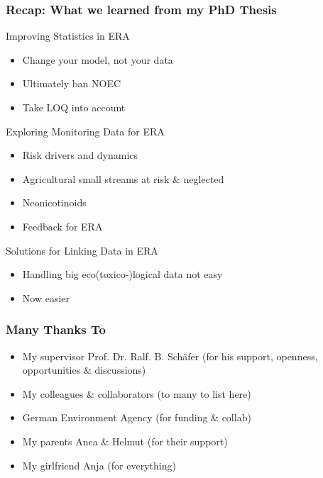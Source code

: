 \documentclass[
	10pt
	]{beamer}
\begin{document}
\begin{frame}
\frametitle{Recap: What we learned from my PhD Thesis}
	\begin{exampleblock}{\checkmark Improving Statistics in ERA}
		\begin{itemize}
			\item Change your model, not your data
			\item Ultimately ban NOEC
			\item Take LOQ into account
		\end{itemize}
	\end{exampleblock}

\pause
	\begin{exampleblock}{\checkmark Exploring Monitoring Data for ERA}
		\begin{itemize}
			\item Risk drivers and dynamics
			\item Agricultural small streams at risk \& neglected
			\item Neonicotinoids
			\item Feedback for ERA
		\end{itemize}
	\end{exampleblock}

\pause
	\begin{exampleblock}{\checkmark Solutions for Linking Data in ERA}
		\begin{itemize}
			\item Handling big eco(toxico-)logical data not easy
			\item Now easier
		\end{itemize}
	\end{exampleblock}
\end{frame}

\begin{frame}
\frametitle{Many Thanks To}
	\begin{itemize}
		\item My supervisor \alert{Prof. Dr. Ralf. B. Schäfer} (for his support, openness, opportunities \& discussions)
		\item My \alert{colleagues \& collaborators} (to many to list here)
		\item \alert{{G}erman Environment Agency} (for funding \& collab)
		\item My parents \alert{Anca \& Helmut} (for their support)
		\item My girlfriend \alert{Anja} (for everything)
	\end{itemize}

\end{frame}
\end{document}
